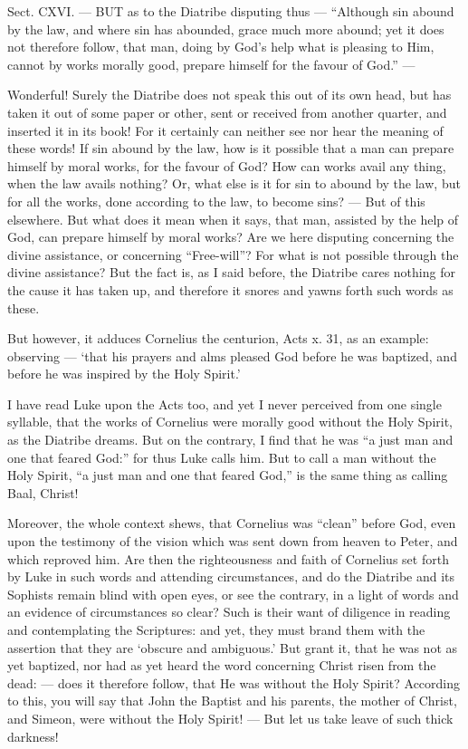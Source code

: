 
Sect. CXVI. — BUT as to the Diatribe disputing thus — “Although sin abound by the law, and where sin has abounded, grace much more abound; yet it does not therefore follow, that man, doing by God’s help what is pleasing to Him, cannot by works morally good, prepare himself for the favour of God.” —

Wonderful! Surely the Diatribe does not speak this out of its own head, but has taken it out of some paper or other, sent or received from another quarter, and inserted it in its book! For it certainly can neither see nor hear the meaning of these words! If sin abound by the law, how is it possible that a man can prepare himself by moral works, for the favour of God? How can works avail any thing, when the law avails nothing? Or, what else is it for sin to abound by the law, but for all the works, done according to the law, to become sins? — But of this elsewhere. But what does it mean when it says, that man, assisted by the help of God, can prepare himself by moral works? Are we here disputing concerning the divine assistance, or concerning “Free-will”? For what is not possible through the divine assistance? But the fact is, as I said before, the Diatribe cares nothing for the cause it has taken up, and therefore it snores and yawns forth such words as these.

But however, it adduces Cornelius the centurion, Acts x. 31, as an example: observing — ‘that his prayers and alms pleased God before he was baptized, and before he was inspired by the Holy Spirit.’

I have read Luke upon the Acts too, and yet I never perceived from one single syllable, that the works of Cornelius were morally good without the Holy Spirit, as the Diatribe dreams. But on the contrary, I find that he was “a just man and one that feared God:” for thus Luke calls him. But to call a man without the Holy Spirit, “a just man and one that feared God,” is the same thing as calling Baal, Christ!

Moreover, the whole context shews, that Cornelius was “clean” before God, even upon the testimony of the vision which was sent down from heaven to Peter, and which reproved him. Are then the righteousness and faith of Cornelius set forth by Luke in such words and attending circumstances, and do the Diatribe and its Sophists remain blind with open eyes, or see the contrary, in a light of words and an evidence of circumstances so clear? Such is their want of diligence in reading and contemplating the Scriptures: and yet, they must brand them with the assertion that they are ‘obscure and ambiguous.’ But grant it, that he was not as yet baptized, nor had as yet heard the word concerning Christ risen from the dead: — does it therefore follow, that He was without the Holy Spirit? According to this, you will say that John the Baptist and his parents, the mother of Christ, and Simeon, were without the Holy Spirit! — But let us take leave of such thick darkness!

